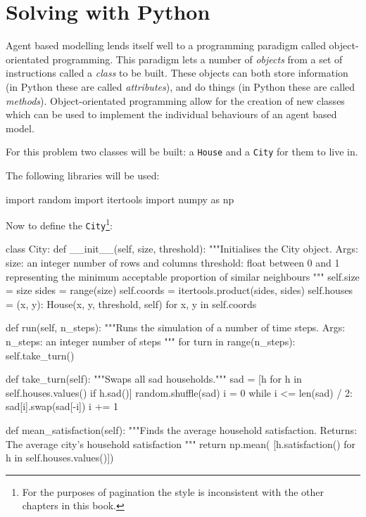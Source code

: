 \section{Solving with Python}\label{sec:agent_based_simulation_solving-with-python}

Agent based modelling lends itself well to a programming paradigm called
object-orientated programming.
This paradigm lets a number of \textit{objects} from a set of instructions
called a \textit{class} to be built.
These objects can both store information (in Python these are called
\textit{attributes}), and do things (in Python these are called
\textit{methods}).
Object-orientated programming allow for the creation of new classes which can be
used to implement the individual behaviours of an agent based model.

For this problem two classes will be built: a
\texttt{House} and a \texttt{City} for them to live in.

The following libraries will be used:

\begin{pyin}
import random
import itertools
import numpy as np
\end{pyin}

Now to define the \texttt{City}\footnote{
For the purposes of pagination the style is inconsistent with the other
chapters in this book.
}:

\begin{pyin}
class City:
    def __init__(self, size, threshold):
        """Initialises the City object.
        Args:
            size: an integer number of rows and columns
            threshold: float between 0 and 1 representing the
            minimum acceptable proportion of similar neighbours
        """
        self.size = size
        sides = range(size)
        self.coords = itertools.product(sides, sides)
        self.houses = {
            (x, y): House(x, y, threshold, self)
            for x, y in self.coords}

    def run(self, n_steps):
        """Runs the simulation of a number of time steps.
        Args:
            n_steps: an integer number of steps
        """
        for turn in range(n_steps):
            self.take_turn()

    def take_turn(self):
        """Swaps all sad households."""
        sad = [h for h in self.houses.values() if h.sad()]
        random.shuffle(sad)
        i = 0
        while i <= len(sad) / 2:
            sad[i].swap(sad[-i])
            i += 1

    def mean_satisfaction(self):
        """Finds the average household satisfaction.
        Returns:
            The average city's household satisfaction
        """
        return np.mean(
            [h.satisfaction() for h in self.houses.values()])
\end{pyin}

